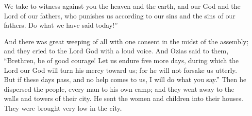 {We take to witness against you the heaven and the earth, and our God and the Lord of our fathers, who punishes us according to our sins and the sins of our fathers. Do what we have said today!”
\par }{\PP {}And there was great weeping of all with one consent in the midst of the assembly; and they cried to the Lord God with a loud voice.
And Ozias said to them, “Brethren, be of good courage! Let us endure five more days, during which the Lord our God will turn his mercy toward us; for he will not forsake us utterly.
But if these days pass, and no help comes to us, I will do what you say.”
Then he dispersed the people, every man to his own camp; and they went away to the walls and towers of their city. He sent the women and children into their houses. They were brought very low in the city.

}
